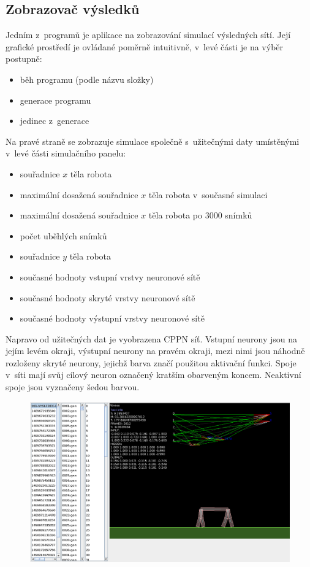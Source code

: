 \documentclass[a4]{article}
\begin{document}
\subsection{Zobrazovač výsledků}
Jedním z~programů je aplikace na zobrazování simulací výsledných sítí. Její grafické prostředí je ovládané poměrně intuitivně, v~levé části je na výběr postupně:
\begin{itemize}
\item{běh programu (podle názvu složky)}
\item{generace programu}
\item{jedinec z~generace}
\end{itemize}
Na pravé straně se zobrazuje simulace společně s~užitečnými daty umístěnými v~levé části simulačního panelu:
\begin{itemize}
\item{souřadnice $x$ těla robota}
\item{maximální dosažená souřadnice $x$ těla robota v~současné simulaci}
\item{maximální dosažená souřadnice $x$ těla robota po 3000 snímků}
\item{počet uběhlých snímků}
\item{souřadnice $y$ těla robota}
\item{současné hodnoty vstupní vrstvy neuronové sítě}
\item{současné hodnoty skryté vrstvy neuronové sítě}
\item{současné hodnoty výstupní vrstvy neuronové sítě}
\end{itemize}
Napravo od užitečných dat je vyobrazena CPPN síť. Vstupní neurony jsou na jejím levém okraji, výstupní neurony na pravém okraji, mezi nimi jsou náhodně rozloženy skryté neurony, jejichž barva značí použitou aktivační funkci. Spoje v~síti mají svůj cílový neuron označený kratším obarveným koncem. Neaktivní spoje jsou vyznačeny šedou barvou.
\begin{figure}
\includegraphics[width=1\linewidth]{program}
\end{figure}
\end{document}

